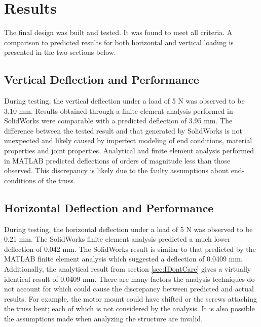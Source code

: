 \section{Results}

The final design was built and tested. 
It was found to meet all criteria.
A comparison to predicted results for both horizontal and vertical loading is presented in the two sections below.

\subsection{Vertical Deflection and Performance}

During testing, the vertical deflection under a load of 5 N was observed to be 3.10 mm.
Results obtained through a finite element analysis performed in SolidWorks were comparable with a predicted deflection of 3.95 mm.
The difference between the tested result and that generated by SolidWorks is not unexpected and likely caused by imperfect modeling of end conditions, material properties and joint properties.
Analytical and finite element analysis performed in MATLAB predicted deflections of orders of magnitude less than those observed.
This discrepancy is likely due to the faulty assumptions about end-conditions of the truss.

\subsection{Horizontal Deflection and Performance}

During testing, the horizontal deflection under a load of 5 N was observed to be 0.21 mm.
The SolidWorks finite element analysis predicted a much lower deflection of 0.042 mm.
The SolidWorks result is similar to that predicted by the MATLAB finite element analysis which suggested a deflection of 0.0409 mm.
Additionally, the analytical result from section \ref{sec:IDontCare} gives a virtually identical result of 0.0409 mm. 
There are many factors the analysis techniques do not account for which could cause the discrepancy between predicted and actual results. %
For example, the motor mount could have shifted or the screws attaching the truss bent; each of which is not considered by the analysis.
It is also possible the assumptions made when analyzing the structure are invalid.